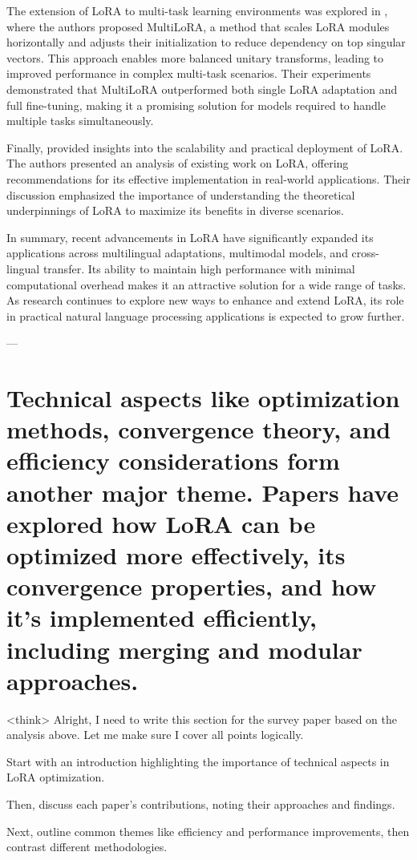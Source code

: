 \documentclass[conference]{IEEEtran}
\begin{document}
The extension of LoRA to multi-task learning environments was explored in \cite{b5}, where the authors proposed MultiLoRA, a method that scales LoRA modules horizontally and adjusts their initialization to reduce dependency on top singular vectors. This approach enables more balanced unitary transforms, leading to improved performance in complex multi-task scenarios. Their experiments demonstrated that MultiLoRA outperformed both single LoRA adaptation and full fine-tuning, making it a promising solution for models required to handle multiple tasks simultaneously.

Finally, \cite{b1} provided insights into the scalability and practical deployment of LoRA. The authors presented an analysis of existing work on LoRA, offering recommendations for its effective implementation in real-world applications. Their discussion emphasized the importance of understanding the theoretical underpinnings of LoRA to maximize its benefits in diverse scenarios.

In summary, recent advancements in LoRA have significantly expanded its applications across multilingual adaptations, multimodal models, and cross-lingual transfer. Its ability to maintain high performance with minimal computational overhead makes it an attractive solution for a wide range of tasks. As research continues to explore new ways to enhance and extend LoRA, its role in practical natural language processing applications is expected to grow further.

---

\section{Technical aspects like optimization methods, convergence theory, and efficiency considerations form another major theme. Papers have explored how LoRA can be optimized more effectively, its convergence properties, and how it's implemented efficiently, including merging and modular approaches.}
<think>
Alright, I need to write this section for the survey paper based on the analysis above. Let me make sure I cover all points logically.

Start with an introduction highlighting the importance of technical aspects in LoRA optimization.

Then, discuss each paper's contributions, noting their approaches and findings.

Next, outline common themes like efficiency and performance improvements, then contrast different methodologies.
\end{document}
